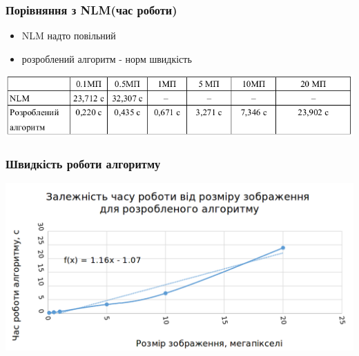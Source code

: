 \documentclass[12pt]{beamer}
\begin{document}
\begin{frame}\frametitle{ Порівняння з NLM(час роботи)}
	\begin{itemize}
		\item NLM надто повільний
		\item розроблений алгоритм - норм швидкість
	\end{itemize}
	\includegraphics[scale=0.4]{images/table_imsize}
\end{frame}

\begin{frame}\frametitle{ Швидкість роботи алгоритму }
	\includegraphics[scale=0.25]{images/super_graph}
\end{frame}
\end{document}
